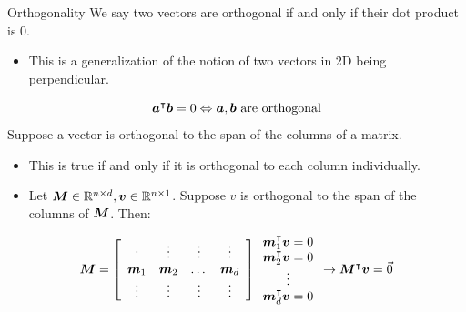 \documentclass[aspectratio=169]{../latex_main/tntbeamer}  %
\begin{document}
	\begin{frame}{Orthogonality}
	    We say two vectors are orthogonal if and only if their dot product is 0.
	    \begin{itemize}
	        \item This is a generalization of the notion of two vectors in 2D being perpendicular.
	    \end{itemize}
	    \begin{equation*}
	        \bm{a}^\intercal\bm{b} = 0 \Leftrightarrow \bm{a},\bm{b} \text{ are orthogonal}
	    \end{equation*}
	    Suppose a vector is orthogonal to the span of the columns of a matrix.
	    \begin{itemize}
	        \item This is true if and only if it is orthogonal to each column individually. 
	        \item Let $\bm{M} \in \mathbb{R}^{n\times d}, \bm{v} \in \mathbb{R}^{n\times 1}$. Suppose $v$ is orthogonal to the span of the columns of $\bm{M}$. Then:
	    \end{itemize}
	    \begin{align*}
    	   \bm{M} =  \left[\begin{array}{cccc}
                \vdots & \vdots & \vdots & \vdots\\
                \bm{m}_1 &  \bm{m}_2 & \dots & \bm{m}_d\\
                \vdots & \vdots & \vdots & \vdots
            \end{array}\right]
            \begin{array}{c}
                \bm{m}_1^\intercal \bm{v} = 0\\
                \bm{m}_2^\intercal \bm{v} = 0\\
                \vdots\\
                \bm{m}_d^\intercal \bm{v} = 0\\
            \end{array}
            \rightarrow \bm{M}^\intercal \bm{v} = \Vec{0}
         \end{align*}
	\end{frame}
	
\end{document}
